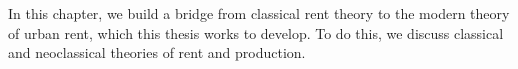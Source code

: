 In this chapter, we build a bridge from \gls{classical rent theory} to the modern theory of urban rent, which this thesis works to develop. To do this, we discuss classical and neoclassical theories of rent and production. 

 
